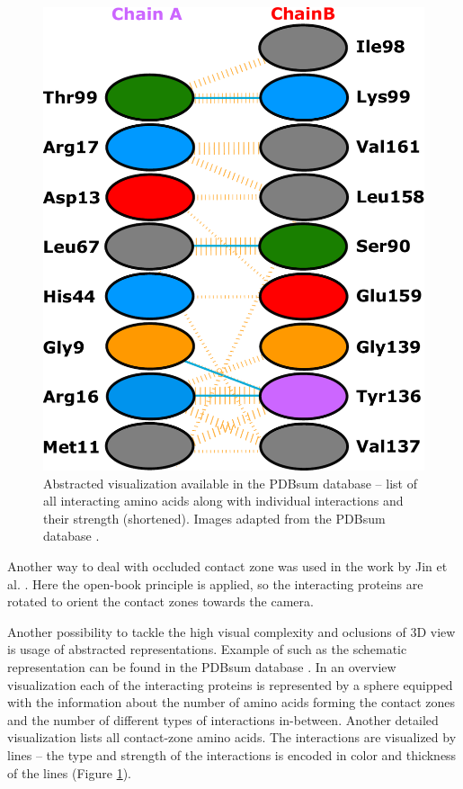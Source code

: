 \begin{figure}
\vspace{-10pt}
  \begin{center}
  \includegraphics[width=\linewidth]{pictures/pdbsum2.pdf}
  \caption{Abstracted visualization available in the PDBsum database -- list of all interacting amino acids along with individual interactions and their strength (shortened). Images adapted from the PDBsum database \cite{laskowski1997pdbsum}.}
  \label{Fig:pdbsum}  
  \end{center}
  \vspace{-20pt}
\end{figure}

Another way to deal with occluded contact zone was used in the work by Jin et al. \cite{jin2014targeting}. Here the open-book principle is applied, so the interacting proteins are rotated to orient the contact zones towards the camera.

Another possibility to tackle the high visual complexity and oclusions of 3D view is usage of abstracted representations. Example of such as the schematic representation can be found in the PDBsum database \cite{laskowski1997pdbsum}. In an overview visualization each of the interacting proteins is represented by a sphere equipped with the information about the number of amino acids forming the contact zones and the number of different types of interactions in-between. Another detailed visualization lists all contact-zone amino acids. The interactions are visualized by lines -- the type and strength of the interactions is encoded in color and thickness of the lines (Figure \ref{Fig:pdbsum}).

